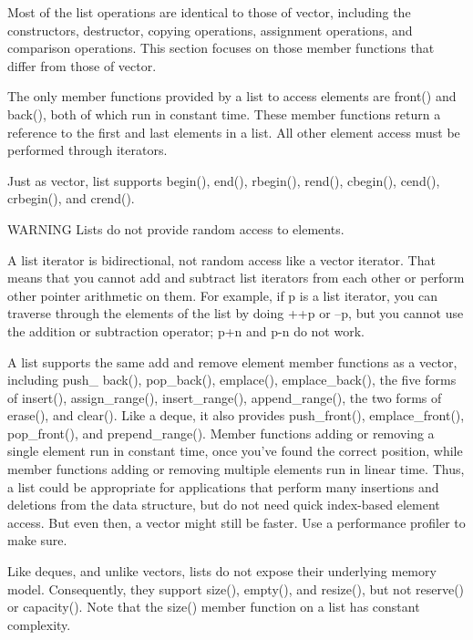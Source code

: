 Most of the list operations are identical to those of vector, including the constructors, destructor, copying operations, assignment operations, and comparison operations. This section focuses on those member functions that differ from those of vector.


The only member functions provided by a list to access elements are front() and back(), both of which run in constant time. These member functions return a reference to the first and last elements in a list. All other element access must be performed through iterators.

Just as vector, list supports begin(), end(), rbegin(), rend(), cbegin(), cend(), crbegin(), and crend().

\begin{myWarning}{WARNING}
Lists do not provide random access to elements.
\end{myWarning}


A list iterator is bidirectional, not random access like a vector iterator. That means that you cannot add and subtract list iterators from each other or perform other pointer arithmetic on them. For example, if p is a list iterator, you can traverse through the elements of the list by doing ++p or --p, but you cannot use the addition or subtraction operator; p+n and p-n do not work.


A list supports the same add and remove element member functions as a vector, including push\_ back(), pop\_back(), emplace(), emplace\_back(), the five forms of insert(), assign\_range(), insert\_range(), append\_range(), the two forms of erase(), and clear(). Like a deque, it also provides push\_front(), emplace\_front(), pop\_front(), and prepend\_range(). Member functions adding or removing a single element run in constant time, once you’ve found the correct position, while member functions adding or removing multiple elements run in linear time. Thus, a list could be appropriate for applications that perform many insertions and deletions from the data structure, but do not need quick index-based element access. But even then, a vector might still be faster. Use a performance profiler to make sure.


Like deques, and unlike vectors, lists do not expose their underlying memory model. Consequently, they support size(), empty(), and resize(), but not reserve() or capacity(). Note that the size() member function on a list has constant complexity.


